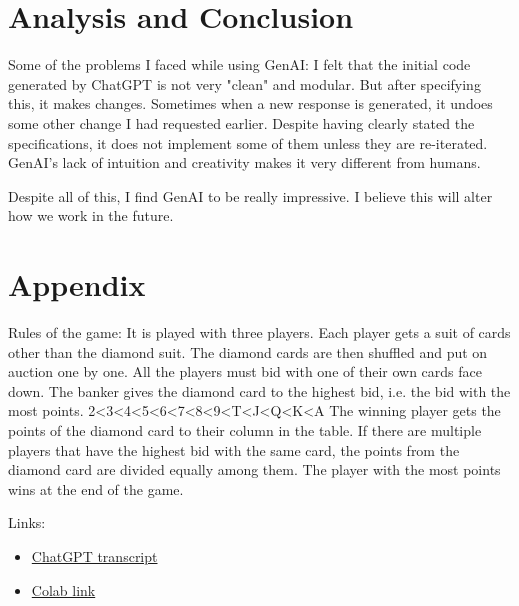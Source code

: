 \documentclass{article}
\begin{document}
\medskip

\section{Analysis and Conclusion}

Some of the problems I faced while using GenAI:
I felt that the initial code generated by ChatGPT is not very "clean" and modular. But after specifying this, it makes changes.
Sometimes when a new response is generated, it undoes some other change I had requested earlier. 
Despite having clearly stated the specifications, it does not implement some of them unless they are re-iterated.
GenAI's lack of intuition and creativity makes it very different from humans.
\medskip 

Despite all of this, I find GenAI to be really impressive. I believe this will alter how we work in the future.

\section{Appendix}

Rules of the game:
It is played with three players. Each player gets a suit of cards other than the diamond suit. 
The diamond cards are then shuffled and put on auction one by one. 
All the players must bid with one of their own cards face down. 
The banker gives the diamond card to the highest bid, i.e. the bid with the most points.
2<3<4<5<6<7<8<9<T<J<Q<K<A
The winning player gets the points of the diamond card to their column in the table. If there are multiple players that have the highest bid with the same card, the points from the diamond card are divided equally among them.
The player with the most points wins at the end of the game.

\medskip
\medskip
Links: 

\begin{itemize}
    \item \href{https://docs.google.com/document/d/1Ux5MJa6416Uxm11PcR5k4KstW9Mxmtk88cdWXKjzT_M/edit?usp=sharing}{ChatGPT transcript}
    \item  \href{https://colab.research.google.com/drive/1xPR6YIhkXXMHtmyVIoWZa9e2pdipwR1P?usp=sharing}{Colab link}
\end{itemize}

 
\end{document}

